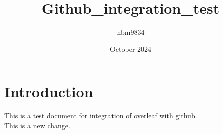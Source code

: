 \documentclass{article}
\title{Github_integration_test}
\author{hbm9834 }
\date{October 2024}
\begin{document}
\maketitle

\section{Introduction}
This is a test document for integration of overleaf with github.\\
This is a new change.
\end{document}
